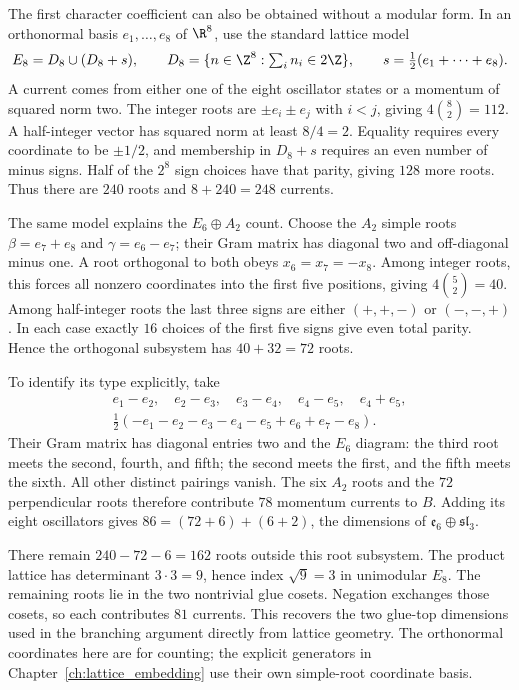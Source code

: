 \begin{example}
\label{ex:char-E8-root-count}
The first character coefficient can also be obtained without a modular
form. In an orthonormal basis $e_1,\ldots,e_8$ of $\R^8$, use
the standard lattice model
\[
 E_8=D_8\cup(D_8+s),\qquad
 D_8=\{n\in\Z^8:\textstyle\sum_i n_i\in2\Z\},
 \qquad s=\tfrac12(e_1+\cdots+e_8).
\]
A current comes from either one of the eight oscillator states or a
momentum of squared norm two. The integer roots are
$\pm e_i\pm e_j$ with $i<j$, giving $4\binom82=112$.
A half-integer vector has squared norm at least $8/4=2$.
Equality requires every coordinate to be $\pm1/2$, and membership
in $D_8+s$ requires an even number of minus signs. Half of the
$2^8$ sign choices have that parity, giving $128$ more roots.
Thus there are $240$ roots and $8+240=248$ currents.

The same model explains the $E_6\oplus A_2$ count. Choose the
$A_2$ simple roots $\beta=e_7+e_8$ and $\gamma=e_6-e_7$;
their Gram matrix has diagonal two and off-diagonal minus one.
A root orthogonal to both obeys
$x_6=x_7=-x_8$. Among integer roots, this forces all nonzero
coordinates into the first five positions, giving
$4\binom52=40$. Among half-integer roots the last three signs
are either $(+,+,-)$ or $(-,-,+)$. In each case exactly $16$
choices of the first five signs give even total parity. Hence the
orthogonal subsystem has $40+32=72$ roots.

To identify its type explicitly, take
\[
 \begin{gathered}
 e_1-e_2,\quad e_2-e_3,\quad e_3-e_4,\quad
 e_4-e_5,\quad e_4+e_5,\\
 \tfrac12(-e_1-e_2-e_3-e_4-e_5+e_6+e_7-e_8).
 \end{gathered}
\]
Their Gram matrix has diagonal entries two and the $E_6$ diagram: the third
root meets the second, fourth, and fifth; the second meets the
first, and the fifth meets the sixth. All other distinct pairings
vanish. The six $A_2$ roots and the $72$ perpendicular roots
therefore contribute $78$ momentum currents to $B$. Adding its
eight oscillators gives $86=(72+6)+(6+2)$, the dimensions of
$\mathfrak e_6\oplus\mathfrak{sl}_3$.

There remain $240-72-6=162$ roots outside this root subsystem.
The product lattice has determinant $3\cdot3=9$, hence index
$\sqrt9=3$ in unimodular $E_8$. The remaining roots lie in the
two nontrivial glue cosets. Negation exchanges those cosets, so each contributes
$81$ currents. This recovers the two glue-top dimensions used
in the branching argument directly from lattice geometry. The
orthonormal coordinates here are for counting; the explicit
generators in Chapter~\ref{ch:lattice_embedding} use their own
simple-root coordinate basis.
\end{example}

